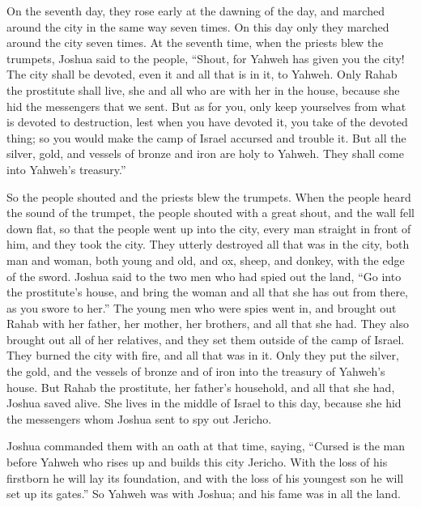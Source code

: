  On the seventh day, they rose early at the dawning of
the day, and marched around the city in the same way seven times. On
this day only they marched around the city seven times. 
At the seventh time, when the priests blew the trumpets, Joshua said to
the people, ``Shout, for Yahweh has given you the city! 
The city shall be devoted, even it and all that is in it, to Yahweh.
Only Rahab the prostitute shall live, she and all who are with her in
the house, because she hid the messengers that we sent. 
But as for you, only keep yourselves from what is devoted to
destruction, lest when you have devoted it, you take of the devoted
thing; so you would make the camp of Israel accursed and trouble it.
 But all the silver, gold, and vessels of bronze and iron
are holy to Yahweh. They shall come into Yahweh's treasury.''

 So the people shouted and the priests blew the trumpets.
When the people heard the sound of the trumpet, the people shouted with
a great shout, and the wall fell down flat, so that the people went up
into the city, every man straight in front of him, and they took the
city.  They utterly destroyed all that was in the city,
both man and woman, both young and old, and ox, sheep, and donkey, with
the edge of the sword.  Joshua said to the two men who
had spied out the land, ``Go into the prostitute's house, and bring the
woman and all that she has out from there, as you swore to her.''
 The young men who were spies went in, and brought out
Rahab with her father, her mother, her brothers, and all that she had.
They also brought out all of her relatives, and they set them outside of
the camp of Israel.  They burned the city with fire, and
all that was in it. Only they put the silver, the gold, and the vessels
of bronze and of iron into the treasury of Yahweh's house.
 But Rahab the prostitute, her father's household, and
all that she had, Joshua saved alive. She lives in the middle of Israel
to this day, because she hid the messengers whom Joshua sent to spy out
Jericho.

 Joshua commanded them with an oath at that time, saying,
``Cursed is the man before Yahweh who rises up and builds this city
Jericho. With the loss of his firstborn he will lay its foundation, and
with the loss of his youngest son he will set up its gates.''
 So Yahweh was with Joshua; and his fame was in all the
land.


